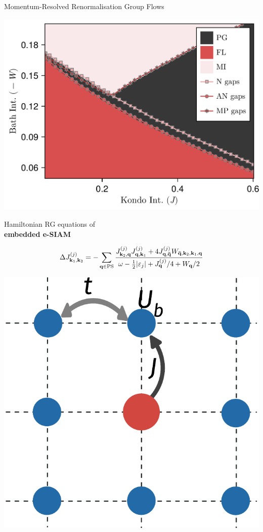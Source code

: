 \documentclass[11pt,aspectratio=169]{beamer}
\newcommand\focus[1]{%
	{\alert{\textbf{#1}}}
}
\begin{document}
\begin{frame}{Momentum-Resolved Renormalisation Group Flows}
\begin{minipage}{0.3\textwidth}
	\includegraphics[width=\textwidth]{phaseDiagram.pdf}
\end{minipage}
\hspace*{\fill}
\begin{minipage}{0.45\textwidth}
	Hamiltonian RG equations of \\
	\focus{embedded e-SIAM}
	\[\Delta J^{(j)}_{{\bf k}_1, {\bf k}_2} = -\sum_{{\bf q} \in \text{PS}} \frac{J^{(j)}_{{\bf k}_2,{\bf q}} J^{(j)}_{{\bf q},{\bf k}_1} + 4J^{(j)}_{{\bf q}, {\bf \bar q}} W_{{\bf \bar q}, {\bf k}_2, {\bf k}_1, {\bf q}}}{\omega - \frac{1}{2}|\varepsilon_j| + J^{(j)}_{{\bf q}}/4 + W_{{\bf q}}/2}\]
\end{minipage}
\hspace*{\fill}
\begin{minipage}{0.2\textwidth}
	\includegraphics[width=\textwidth]{pWaveEsiam.pdf}
\end{minipage}


\end{frame}
\end{document}
